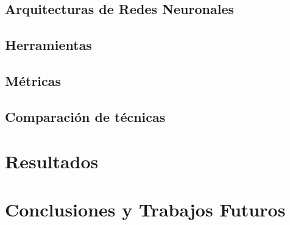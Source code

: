 \documentclass[a4paper,12pt,spanish]{book}
\begin{document}
\section{Arquitecturas de Redes Neuronales}


\section{Herramientas}


\section{Métricas} \label{sec:metricas}


\section{Comparación de técnicas} \label{sec:comparacion}


\chapter{Resultados} \label{sec:resultados}









\chapter{Conclusiones y Trabajos Futuros}


\newpage
\footnotesize
\nocite{python-docs}
\nocite{jupyter-docs}
\nocite{nabu}
\nocite{numpy-docs}
\nocite{pandas-docs}
\nocite{pytorch-docs}
\nocite{mlflow-docs}
\nocite{optuna-docs}
\printbibliography[heading=bibintoc]

\newpage
\newpage
\vfill
\addtocounter{page}{-1}
\clearpage
\thispagestyle{empty}
\phantom{a}
\vfill
\newpage
\vfill
\addtocounter{page}{-1}
\end{document}
